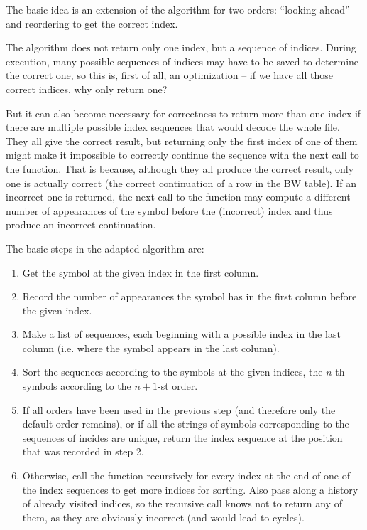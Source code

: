 \documentclass[a4paper]{scrreprt}
\begin{document}
The basic idea is an extension of the algorithm for two orders: ``looking
ahead'' and reordering to get the correct index.

The algorithm does not return only one index, but a sequence of indices.
During execution, many possible sequences of indices may have to be saved to
determine the correct one, so this is, first of all, an optimization -- if we
have all those correct indices, why only return one?

But it can also become
necessary for correctness to return more than one index if there are multiple
possible index sequences that would decode the whole file. They all give the
correct result, but returning only the first index of one of them might make it
impossible to correctly continue the sequence with the next call to the
function. That is because, although they all produce the correct result, only
one is actually correct (the correct continuation of a row in the BW table). If
an incorrect one is returned, the next call to the function may compute a
different number of appearances of the symbol before the (incorrect) index and
thus produce an incorrect continuation.

The basic steps in the adapted algorithm are:

\begin{enumerate}
  \item Get the symbol at the given index in the first column.
  \item Record the number of appearances the symbol has in the first column
  before the given index.
  \item Make a list of sequences, each beginning with a possible index in the
  last column (i.e. where the symbol appears in the last column).
  \item Sort the sequences according to the symbols at the given indices, the
  \(n\)-th symbols according to the \(n + 1\)-st order.
  \item If all orders have been used in the previous step (and therefore only
  the default order remains), or if all the strings of symbols corresponding to
  the sequences of incides are unique, return the index sequence at the position
  that was recorded in step 2.
  \item Otherwise, call the function recursively for every index at the end of
  one of the index sequences to get more indices for sorting. Also pass along a
  history of already visited indices, so the recursive call knows not to return
  any of them, as they are obviously incorrect (and would lead to cycles).
\end{enumerate}
\end{document}
